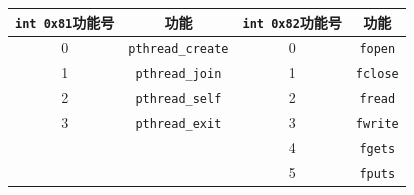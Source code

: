 \documentclass[logo,reportComp]{thesis}
\begin{document}
\begin{center}
\begin{tabular}{|c|c||c|c|}\hline
\verb'int 0x81'\textbf{功能号} & \textbf{功能} & \verb'int 0x82'\textbf{功能号} & \textbf{功能}\\\hline
0 & \verb'pthread_create' & 0 & \verb'fopen'\\\hline
1 & \verb'pthread_join' & 1 & \verb'fclose'\\\hline
2 & \verb'pthread_self' & 2 & \verb'fread'\\\hline
3 & \verb'pthread_exit' & 3 & \verb'fwrite'\\\hline
&& 4 & \verb'fgets'\\\hline
&& 5 & \verb'fputs'\\\hline
\end{tabular}
\end{center}
\end{document}
